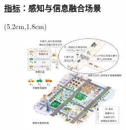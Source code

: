 \begin{frame}
\frametitle{\underline{指标}：感知与信息融合场景}
\newBackground
\begin{center}
\begin{textblock*}{\textwidth}(5.2cm,1.8cm)
\begin{figure}
\includegraphics[width=0.47\textwidth]{fig/Fig2-2a-architerture.pdf}
\end{figure}
\end{textblock*}
\end{center}


\end{frame}
